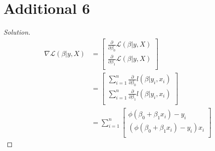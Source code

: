 \documentclass{article}
\newenvironment{solution}
  {\renewcommand\qedsymbol{$\blacksquare$}\begin{proof}[Solution]$ $}
  {\end{proof}}
\begin{document}
\section{Additional 6}
\begin{solution}
\begin{align*}
    \nabla \mathcal L (\beta | y, X) &= \begin{bmatrix}
    \frac{\partial}{\partial \beta_0} \mathcal L(\beta | y, X) \\
    \frac{\partial}{\partial \beta_1} \mathcal L(\beta | y, X) \\
    \end{bmatrix} \\
    &= \begin{bmatrix}
        \sum_{i=1}^{n} \frac{\partial}{\partial \beta_0} l(\beta | y_i, x_i) \\
        \sum_{i=1}^{n} \frac{\partial}{\partial \beta_1} l(\beta | y_i, x_i) \\
    \end{bmatrix} \\
    &= \sum_{i=1}^{n} \begin{bmatrix}
        \phi(\beta_0 + \beta_1 x_i) - y_i \\
        (\phi(\beta_0 + \beta_1 x_i) - y_i)x_i \\
    \end{bmatrix}
\end{align*}



\end{solution}
\end{document}
